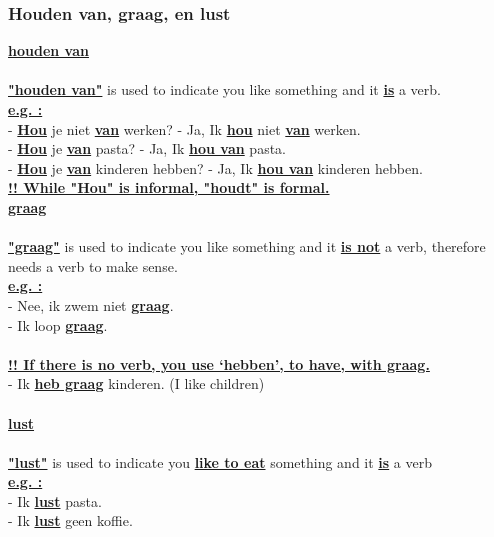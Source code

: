 \documentclass[a4paper,14pt]{extarticle}
\newcommand{\attention}[1]{\underline{\textbf{!! #1}}}
\newcommand{\emp}[1]{\underline{\textbf{#1}}}
\begin{document}
\subsubsection{Houden van, graag, en lust}
\emp{houden van} \\ \\
\emp{"houden van"} is used to indicate you like something and it \emp{is} a verb. \\
\emp{e.g. :} \\
- \emp{Hou} je niet \emp{van} werken? - Ja, Ik \emp{hou} niet \emp{van} werken. \\
- \emp{Hou} je \emp{van} pasta? - Ja, Ik \emp{hou van} pasta. \\
- \emp{Hou} je \emp{van} kinderen hebben? - Ja, Ik \emp{hou van} kinderen hebben. \\
\attention{While "Hou" is informal, "houdt" is formal.}
\newpage
\hfill \\
\emp{graag} \\ \\
\emp{"graag"} is used to indicate you like something and it \emp{is not} a verb, therefore needs a verb to make sense. \\
\emp{e.g. :} \\
- Nee, ik zwem niet \emp{graag}. \\
- Ik loop \emp{graag}. \\ \\
\attention{If there is no verb, you use ‘hebben’, to have, with graag.} \\
- Ik \emp{heb graag} kinderen. (I like children)\\ \\
\emp{lust} \\ \\
\emp{"lust"} is used to indicate you \emp{like to eat} something and it \emp{is} a verb\\
\emp{e.g. :} \\
- Ik \emp{lust} pasta. \\
- Ik \emp{lust} geen koffie. \\
\end{document}
